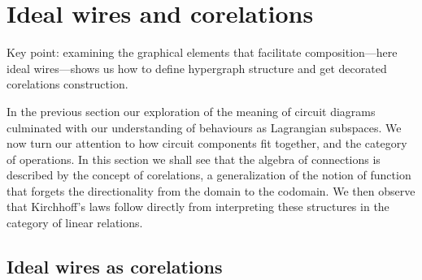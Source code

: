 \section{Ideal wires and corelations} \label{sec:corel}

Key point: examining the graphical elements that facilitate composition---here
ideal wires---shows us how to define hypergraph structure and get decorated
corelations construction.

In the previous section our exploration of the meaning of circuit diagrams 
culminated with our understanding of behaviours as Lagrangian subspaces.  We now 
turn our attention to how circuit components fit together, and the category of 
operations.  In this section we shall see that the algebra of connections is 
described by the concept of corelations, a generalization of the notion of 
function that forgets the directionality from the domain to the codomain. We
then observe that Kirchhoff's laws follow directly from interpreting these
structures in the category of linear relations.

\subsection{Ideal wires as corelations}

